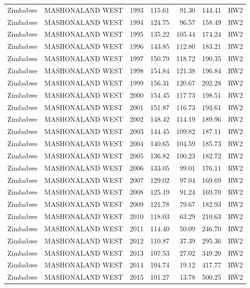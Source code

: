 \begin{longtable}{lllrrrl}
  Zimbabwe & MASHONALAND WEST & 1993 & 115.61 & 91.30 & 144.41 & RW2 \\ 
  Zimbabwe & MASHONALAND WEST & 1994 & 124.75 & 96.57 & 158.49 & RW2 \\ 
  Zimbabwe & MASHONALAND WEST & 1995 & 135.22 & 105.44 & 174.24 & RW2 \\ 
  Zimbabwe & MASHONALAND WEST & 1996 & 143.85 & 112.80 & 183.21 & RW2 \\ 
  Zimbabwe & MASHONALAND WEST & 1997 & 150.79 & 118.72 & 190.35 & RW2 \\ 
  Zimbabwe & MASHONALAND WEST & 1998 & 154.84 & 121.38 & 196.84 & RW2 \\ 
  Zimbabwe & MASHONALAND WEST & 1999 & 156.31 & 120.67 & 202.28 & RW2 \\ 
  Zimbabwe & MASHONALAND WEST & 2000 & 154.45 & 117.73 & 198.51 & RW2 \\ 
  Zimbabwe & MASHONALAND WEST & 2001 & 151.87 & 116.73 & 193.61 & RW2 \\ 
  Zimbabwe & MASHONALAND WEST & 2002 & 148.42 & 114.19 & 189.96 & RW2 \\ 
  Zimbabwe & MASHONALAND WEST & 2003 & 144.45 & 109.82 & 187.11 & RW2 \\ 
  Zimbabwe & MASHONALAND WEST & 2004 & 140.65 & 104.59 & 185.73 & RW2 \\ 
  Zimbabwe & MASHONALAND WEST & 2005 & 136.82 & 100.23 & 182.72 & RW2 \\ 
  Zimbabwe & MASHONALAND WEST & 2006 & 133.05 & 99.01 & 176.11 & RW2 \\ 
  Zimbabwe & MASHONALAND WEST & 2007 & 129.02 & 97.04 & 169.69 & RW2 \\ 
  Zimbabwe & MASHONALAND WEST & 2008 & 125.19 & 91.24 & 169.70 & RW2 \\ 
  Zimbabwe & MASHONALAND WEST & 2009 & 121.78 & 79.67 & 182.93 & RW2 \\ 
  Zimbabwe & MASHONALAND WEST & 2010 & 118.03 & 63.29 & 210.63 & RW2 \\ 
  Zimbabwe & MASHONALAND WEST & 2011 & 114.40 & 50.09 & 246.70 & RW2 \\ 
  Zimbabwe & MASHONALAND WEST & 2012 & 110.87 & 37.39 & 295.36 & RW2 \\ 
  Zimbabwe & MASHONALAND WEST & 2013 & 107.53 & 27.02 & 349.20 & RW2 \\ 
  Zimbabwe & MASHONALAND WEST & 2014 & 104.74 & 19.12 & 417.77 & RW2 \\ 
  Zimbabwe & MASHONALAND WEST & 2015 & 101.27 & 13.78 & 500.25 & RW2 \\ 

\end{longtable}
